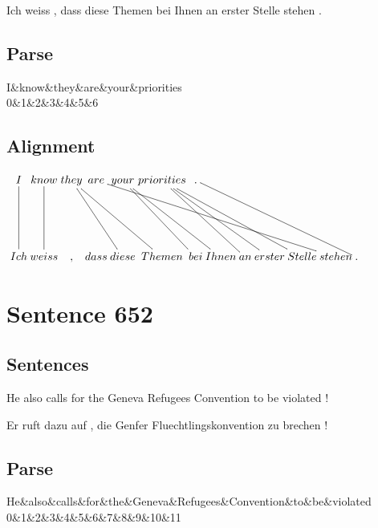 \documentclass{report}
\begin{document}
\noindent Ich weiss , dass diese Themen bei Ihnen an erster Stelle stehen .



\subsection*{Parse}
\begin{dependency}[theme=simple]
\begin{deptext}[column sep=.5cm, row sep=.1ex]
I\&know\&they\&are\&your\&priorities\\
0\&1\&2\&3\&4\&5\&6\\
\end{deptext}
\end{dependency}


\subsection*{Alignment}
\scriptsize{
$
\xymatrix@C-2.3pc{
I \ar @{-} [dd] & know \ar @{-} [dd] & they \ar @{-} [ddrr] \ar @{-} [ddrrr] & are \ar @{-} [ddrrrrrrrr] & your \ar @{-} [ddrrr] \ar @{-} [ddrr] & priorities \ar @{-} [ddrrrr] \ar @{-} [ddrrrrr] \ar @{-} [ddrrr] & . \ar @{-} [ddrrrrrr]\\\\
Ich & weiss & , & dass & diese & Themen & bei & Ihnen & an & erster & Stelle & stehen & .
}$}
\newpage\section*{Sentence 652}

\subsection*{Sentences}
He also calls for the Geneva Refugees Convention to be violated !

\noindent Er ruft dazu auf , die Genfer Fluechtlingskonvention zu brechen !



\subsection*{Parse}
\begin{dependency}[theme=simple]
\begin{deptext}[column sep=.5cm, row sep=.1ex]
He\&also\&calls\&for\&the\&Geneva\&Refugees\&Convention\&to\&be\&violated\\
0\&1\&2\&3\&4\&5\&6\&7\&8\&9\&10\&11\\
\end{deptext}
\end{dependency}
\end{document}

